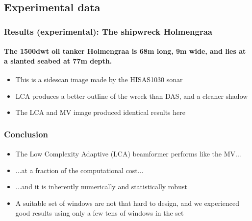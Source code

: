 \documentclass[
    beamer                                       %
 , xelatex                                      %
]{common/mytemplate}
\begin{document}
\subsection{Experimental data}
\begin{frame}
\frametitle{Results (experimental): The shipwreck Holmengraa}
\framesubtitle{The 1500dwt oil tanker Holmengraa is 68m long, 9m wide, and lies at a slanted seabed at 77m depth.}
\vspace{-5pt}
\begin{figure}[H]
\end{figure}
\vspace{-5pt}
\begin{itemize}
\item This is a sidescan image made by the HISAS1030 sonar
\item LCA produces a better outline of the wreck than DAS, and a cleaner shadow
\item The LCA and MV image produced identical results here
\end{itemize}
\end{frame}


\begin{frame}
\frametitle{Conclusion}
\framesubtitle{}
\vspace{-5pt}
\begin{itemize}
\item The Low Complexity Adaptive (LCA) beamformer performs like the MV...
\item ...at a fraction of the computational cost...
\item ...and it is inherently numerically and statistically robust
\item A suitable set of windows are not that hard to design, and we experienced good results using only a few tens of windows in the set
\end{itemize}
\end{frame}
\end{document}
